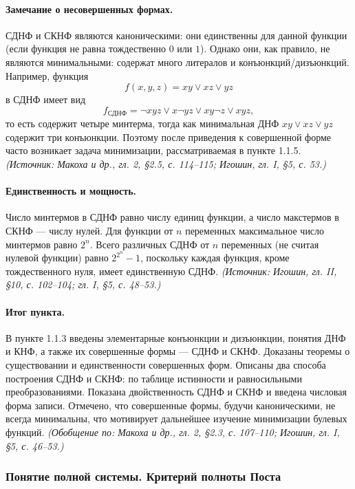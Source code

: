 \documentclass[a4paper,12pt]{article}
\begin{document}
\paragraph{Замечание о несовершенных формах.}
СДНФ и СКНФ являются каноническими: они единственны для данной функции (если функция не равна тождественно \(0\) или \(1\)). Однако они, как правило, не являются минимальными: содержат много литералов и конъюнкций/дизъюнкций. Например, функция
\[
f(x,y,z)=xy\lor xz\lor yz
\]
в СДНФ имеет вид
\[
f_{\text{СДНФ}}=\neg x y z\lor x\neg y z\lor x y\neg z\lor x y z,
\]
то есть содержит четыре минтерма, тогда как минимальная ДНФ \(xy\lor xz\lor yz\) содержит три конъюнкции. Поэтому после приведения к совершенной форме часто возникает задача минимизации, рассматриваемая в пункте 1.1.5.
\textit{(Источник: Макоха и др., гл. 2, §2.5, с. 114--115; Игошин, гл. I, §5, с. 53.)}

\paragraph{Единственность и мощность.}
Число минтермов в СДНФ равно числу единиц функции, а число макстермов в СКНФ — числу нулей. Для функции от \(n\) переменных максимальное число минтермов равно \(2^n\). Всего различных СДНФ от \(n\) переменных (не считая нулевой функции) равно \(2^{2^n}-1\), поскольку каждая функция, кроме тождественного нуля, имеет единственную СДНФ.
\textit{(Источник: Игошин, гл. II, §10, с. 102--104; гл. I, §5, с. 48--53.)}

\paragraph{Итог пункта.}
В пункте 1.1.3 введены элементарные конъюнкции и дизъюнкции, понятия ДНФ и КНФ, а также их совершенные формы — СДНФ и СКНФ. Доказаны теоремы о существовании и единственности совершенных форм. Описаны два способа построения СДНФ и СКНФ: по таблице истинности и равносильными преобразованиями. Показана двойственность СДНФ и СКНФ и введена числовая форма записи. Отмечено, что совершенные формы, будучи каноническими, не всегда минимальны, что мотивирует дальнейшее изучение минимизации булевых функций.
\textit{(Обобщение по: Макоха и др., гл. 2, §2.3, с. 107--110; Игошин, гл. I, §5, с. 46--53.)}

\subsubsection{Понятие полной системы. Критерий полноты Поста}
\end{document}
